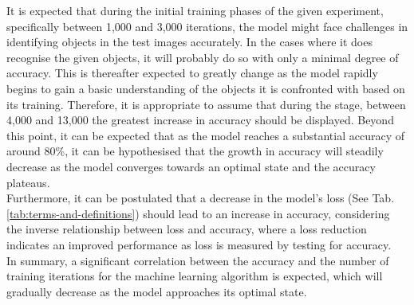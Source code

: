 It is expected that during the initial training phases of the given experiment, specifically between 1,000 and 3,000 iterations, the model might face challenges in identifying objects in the test images accurately. In the cases where it does recognise the given objects, it will probably do so with only a minimal degree of accuracy. This is thereafter expected to greatly change as the model rapidly begins to gain a basic understanding of the objects it is confronted with based on its training. Therefore, it is appropriate to assume that during the stage, between  4,000 and 13,000 the greatest increase in accuracy should be displayed.  Beyond this point, it can be expected that as the model reaches a substantial accuracy of around 80\%, it can be hypothesised that the growth in accuracy will steadily decrease as the model converges towards an optimal state and the accuracy plateaus.\\

Furthermore, it can be postulated that a decrease in the model's loss (See Tab. \ref{tab:terms-and-definitions}) should lead to an increase in accuracy, considering the inverse relationship between loss and accuracy, where a loss reduction indicates an improved performance as loss is measured by testing for accuracy.\\


In summary, a significant correlation between the accuracy and the number of training iterations for the machine learning algorithm is expected, which will gradually decrease as the model approaches its optimal state.
